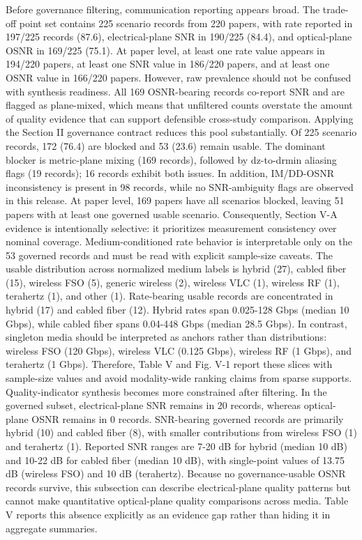 {}Before governance filtering, communication reporting appears broad. The trade-off point set contains 225 scenario records from 220 papers, with rate reported in 197/225 records (87.6\markdownRendererPercentSign{}), electrical-plane SNR in 190/225 (84.4\markdownRendererPercentSign{}), and optical-plane OSNR in 169/225 (75.1\markdownRendererPercentSign{}). At paper level, at least one rate value appears in 194/220 papers, at least one SNR value in 186/220 papers, and at least one OSNR value in 166/220 papers. However, raw prevalence should not be confused with synthesis readiness. All 169 OSNR-bearing records co-report SNR and are flagged as plane-mixed, which means that unfiltered counts overstate the amount of quality evidence that can support defensible cross-study comparison.\markdownRendererParagraphSeparator
{}Applying the Section II governance contract reduces this pool substantially. Of 225 scenario records, 172 (76.4\markdownRendererPercentSign{}) are blocked and 53 (23.6\markdownRendererPercentSign{}) remain usable. The dominant blocker is metric-plane mixing (169 records), followed by dz-to-drmin aliasing flags (19 records); 16 records exhibit both issues. In addition, IM/DD-OSNR inconsistency is present in 98 records, while no SNR-ambiguity flags are observed in this release. At paper level, 169 papers have all scenarios blocked, leaving 51 papers with at least one governed usable scenario. Consequently, Section V-A evidence is intentionally selective: it prioritizes measurement consistency over nominal coverage.\markdownRendererParagraphSeparator
{}Medium-conditioned rate behavior is interpretable only on the 53 governed records and must be read with explicit sample-size caveats. The usable distribution across normalized medium labels is hybrid (27), cabled fiber (15), wireless FSO (5), generic wireless (2), wireless VLC (1), wireless RF (1), terahertz (1), and other (1). Rate-bearing usable records are concentrated in hybrid (17) and cabled fiber (12). Hybrid rates span 0.025-128 Gbps (median 10 Gbps), while cabled fiber spans 0.04-448 Gbps (median 28.5 Gbps). In contrast, singleton media should be interpreted as anchors rather than distributions: wireless FSO (120 Gbps), wireless VLC (0.125 Gbps), wireless RF (1 Gbps), and terahertz (1 Gbps). Therefore, Table V and Fig. V-1 report these slices with sample-size values and avoid modality-wide ranking claims from sparse supports.\markdownRendererParagraphSeparator
{}Quality-indicator synthesis becomes more constrained after filtering. In the governed subset, electrical-plane SNR remains in 20 records, whereas optical-plane OSNR remains in 0 records. SNR-bearing governed records are primarily hybrid (10) and cabled fiber (8), with smaller contributions from wireless FSO (1) and terahertz (1). Reported SNR ranges are 7-20 dB for hybrid (median 10 dB) and 10-22 dB for cabled fiber (median 10 dB), with single-point values of 13.75 dB (wireless FSO) and 10 dB (terahertz). Because no governance-usable OSNR records survive, this subsection can describe electrical-plane quality patterns but cannot make quantitative optical-plane quality comparisons across media. Table V reports this absence explicitly as an evidence gap rather than hiding it in aggregate summaries.\markdownRendererParagraphSeparator
